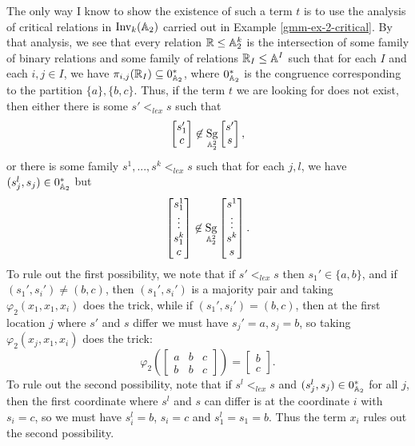 \documentclass[letterpaper,11pt]{article}
\DeclareMathOperator{\Inv}{Inv}
\DeclareMathOperator{\Sg}{Sg}
\begin{document}
\begin{ex}
The only way I know to show the existence of such a term $t$ is to use the analysis of critical relations in $\Inv_k(\bA_2)$ carried out in Example \ref{gmm-ex-2-critical}. By that analysis, we see that every relation $\mathbb{R} \le \mathbb{A}_2^k$ is the intersection of some family of binary relations and some family of relations $\mathbb{R}_I \le \mathbb{A}^I$ such that for each $I$ and each $i,j \in I$, we have $\pi_{i,j}(\mathbb{R}_I) \subseteq 0_{\mathbb{A}_2}^*$, where $0_{\mathbb{A}_2}^*$ is the congruence corresponding to the partition $\{a\}, \{b,c\}$. Thus, if the term $t$ we are looking for does not exist, then either there is some $s' <_{lex} s$ such that
\[
\begin{bmatrix} s_1'\\ c\end{bmatrix} \not\in \Sg_{\bA_2^2}\begin{bmatrix}s' \\ s\end{bmatrix},
\]
or there is some family $s^1, ..., s^k <_{lex} s$ such that for each $j,l$, we have $(s_j^l, s_j) \in 0_{\mathbb{A}_2}^*$ but
\[
\begin{bmatrix} s_1^1\\ \vdots \\ s_1^k\\ c\end{bmatrix} \not\in \Sg_{\bA_2^2}\begin{bmatrix} s^1 \\ \vdots \\ s^k\\ s\end{bmatrix}.
\]
To rule out the first possibility, we note that if $s' <_{lex} s$ then $s_1' \in \{a,b\}$, and if $(s_1',s_i') \ne (b,c)$, then $(s_1',s_i')$ is a majority pair and taking $\varphi_2(x_1,x_1,x_i)$ does the trick, while if $(s_1',s_i') = (b,c)$, then at the first location $j$ where $s'$ and $s$ differ we must have $s_j' = a, s_j = b$, so taking $\varphi_2(x_j, x_1, x_i)$ does the trick:
\[
\varphi_2\left(\begin{bmatrix} a & b & c\\ b & b & c\end{bmatrix}\right) = \begin{bmatrix} b\\ c\end{bmatrix}.
\]
To rule out the second possibility, note that if $s^l <_{lex} s$ and $(s_j^l, s_j) \in 0_{\mathbb{A}_2}^*$ for all $j$, then the first coordinate where $s^l$ and $s$ can differ is at the coordinate $i$ with $s_i = c$, so we must have $s_i^l = b$, $s_i = c$ and $s_1^l = s_1 = b$. Thus the term $x_i$ rules out the second possibility.
\end{ex}
\end{document}
